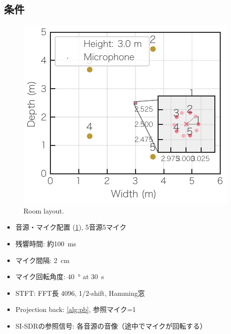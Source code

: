 \documentclass[sip,biber]{now-journal}
\begin{document}
\subsection*{条件}
\begin{figure}[t]
  \centering
  \includegraphics{figures/room_layout.pdf}
  \caption{Room layout.}%
  \label{fig:layout}
\end{figure}
\begin{itemize}
  \item 音源・マイク配置 (\cref{fig:layout}), 5音源5マイク
  \item 残響時間: 約\SI{100}{\milli\second}
  \item マイク間隔: \SI{2}{\centi\metre}
  \item マイク回転角度: \SI{40}{\degree} at \SI{30}{\second}
  \item STFT: FFT長 4096, 1/2-shift, Hamming窓
  \item Projection back: \cref{alg:pb}, 参照マイク=1
  \item SI-SDRの参照信号: 各音源の音像（途中でマイクが回転する）
\end{itemize}
\end{document}
